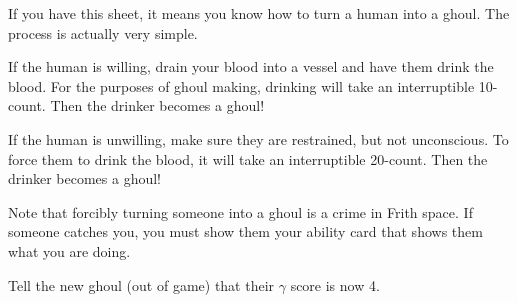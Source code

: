 \documentclass[green]{guildcamp4}
\begin{document}
\name{\gMakeGhoul{}}

If you have this sheet, it means you know how to turn a human into a ghoul. The process is actually very simple. 

If the human is willing, drain your blood into a vessel and have them drink the blood. For the purposes of ghoul making, drinking will take an interruptible 10-count. Then the drinker becomes a ghoul!

If the human is unwilling, make sure they are restrained, but not unconscious. To force them to drink the blood, it will take an interruptible 20-count. Then the drinker becomes a ghoul!

Note that forcibly turning someone into a ghoul is a crime in Frith space. If someone catches you, you must show them your ability card that shows them what you are doing.

Tell the new ghoul (out of game) that their $\gamma$ score is now 4.
\end{document}
